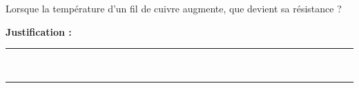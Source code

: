 Lorsque la température d'un fil de cuivre augmente, que devient sa résistance ?

\choices

\noindent\textbf{Justification :} \hrulefill \\[2.5ex]
\rule{\linewidth}{0.4pt} \\[2.5ex]
\rule{\linewidth}{0.4pt}
\vfill
